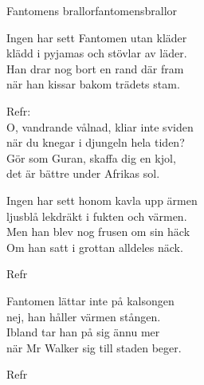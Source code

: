 \begin{song}{Fantomens brallor}{fantomensbrallor}
\begin{vers}
Ingen har sett Fantomen utan kläder\\
klädd i pyjamas och stövlar av läder.\\
Han drar nog bort en rand där fram\\
när han kissar bakom trädets stam.\\
\end{vers}
\begin{vers}
Refr:\\
O, vandrande vålnad, kliar inte sviden\\
när du knegar i djungeln hela tiden?\\
Gör som Guran, skaffa dig en kjol,\\
det är bättre under Afrikas sol.\\
\end{vers}
\begin{vers}
Ingen har sett honom kavla upp ärmen\\
ljusblå lekdräkt i fukten och värmen.\\
Men han blev nog frusen om sin häck\\
Om han satt i grottan alldeles näck.\\
\end{vers}
\begin{vers}
Refr\\
\end{vers}
\begin{vers}
Fantomen lättar inte på kalsongen\\
nej, han håller värmen stången.\\
Ibland tar han på sig ännu mer\\
när Mr Walker sig till staden beger.\\
\end{vers}
\begin{vers}
Refr\\
\end{vers}
\end{song}

\newpage

